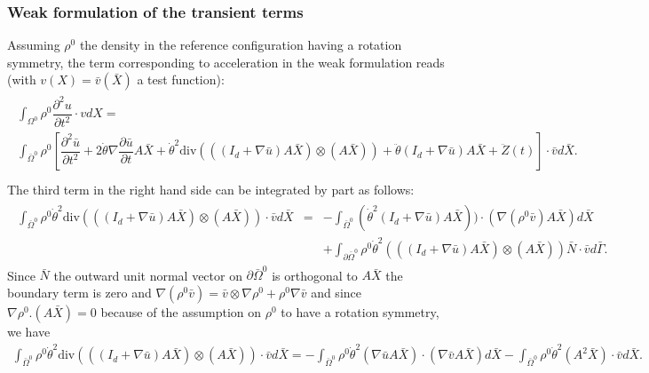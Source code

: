 \documentclass[a4paper,11pt,english]{sphinxmanual}
\begin{document}
\subsubsection{Weak formulation of the transient terms}
\label{\detokenize{userdoc/model_ALE_rotating:weak-formulation-of-the-transient-terms}}
Assuming \(\rho^0\) the density in the reference configuration having a rotation symmetry, the term corresponding to acceleration in the weak formulation reads (with \(v(X) = \bar{v}(\bar{X})\) a test function):
\begin{align*}\!\begin{aligned}
\int_{\Omega^0} \rho^0 \dfrac{\partial^2 u}{\partial t^2}\cdot vdX =\\
\int_{\bar{\Omega}^0} \rho^0 \left[\dfrac{\partial^2 \bar{u}}{\partial t^2} + 2\dot{\theta} \nabla\dfrac{\partial \bar{u}}{\partial t}A \bar{X} +  \dot{\theta}^2\mbox{div}(((I_d + \nabla\bar{u})A \bar{X}) \otimes (A \bar{X}) )  + \ddot{\theta} (I_d + \nabla\bar{u}) A \bar{X}  + \ddot{Z}(t) \right] \cdot \bar{v} d\bar{X}.\\
\end{aligned}\end{align*}
The third term in the right hand side can be integrated by part as follows:
\begin{equation*}
\begin{split}\begin{array}{rcl}
  \int_{\bar{\Omega}^0} \rho^0 \dot{\theta}^2\mbox{div}(((I_d + \nabla\bar{u})A \bar{X}) \otimes (A \bar{X}) ) \cdot \bar{v} d\bar{X} &=& -  \int_{\bar{\Omega}^0} (\dot{\theta}^2 (I_d + \nabla\bar{u})A \bar{X})) \cdot (\nabla (\rho^0 \bar{v}) A \bar{X}) d\bar{X} \\
 && + \int_{\partial \bar{\Omega}^0} \rho^0 \dot{\theta}^2 (((I_d + \nabla\bar{u})A \bar{X}) \otimes (A \bar{X}) ) \bar{N} \cdot \bar{v} d\bar{\Gamma}.
\end{array}\end{split}
\end{equation*}
Since \(\bar{N}\) the outward unit normal vector on \(\partial \bar{\Omega}^0\) is orthogonal to \(A \bar{X}\) the boundary term is zero and \(\nabla (\rho^0 \bar{v}) = \bar{v} \otimes \nabla \rho^0   + \rho^0 \nabla \bar{v}\) and since \(\nabla \rho^0.(A\bar{X}) = 0\) because of the assumption on \(\rho^0\) to have a rotation symmetry, we have
\begin{equation*}
\begin{split}\int_{\bar{\Omega}^0} \rho^0 \dot{\theta}^2\mbox{div}(((I_d + \nabla\bar{u})A \bar{X}) \otimes (A \bar{X}) ) \cdot \bar{v} d\bar{X} = - \int_{\bar{\Omega}^0} \rho^0 \dot{\theta}^2(\nabla\bar{u}A \bar{X}) \cdot (\nabla \bar{v} A \bar{X}) d\bar{X} - \int_{\bar{\Omega}^0} \rho^0 \dot{\theta}^2 (A^2 \bar{X})\cdot \bar{v} d\bar{X}.\end{split}
\end{equation*}
\end{document}
